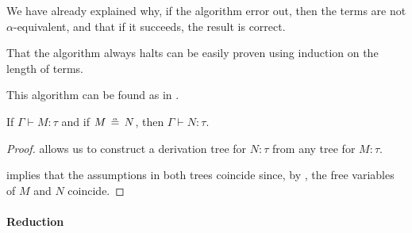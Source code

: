 \begin{defproof}
  We have already explained why, if the algorithm error out, then the terms are not \( \alpha \)-equivalent, and that if it succeeds, the result is correct.

  That the algorithm always halts can be easily proven using induction on the length of terms.
\end{defproof}
\begin{comments}
  \item This algorithm can be found as  in \cite{notebook:code}.
\end{comments}

\begin{proposition}\label{thm:alpha_equivalent_term_typing}
  If \( \Gamma \vdash M: \tau \) and if \( M \aequiv N \), then \( \Gamma \vdash N: \tau \).
\end{proposition}
\begin{proof}
   allows us to construct a derivation tree for \( N: \tau \) from any tree for \( M: \tau \).

   implies that the assumptions in both trees coincide since, by , the free variables of \( M \) and \( N \) coincide.
\end{proof}

\paragraph{Reduction}

